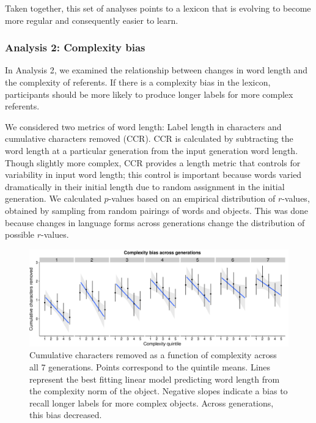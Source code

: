 Taken together, this set of analyses points to a lexicon that is evolving to become more regular and consequently easier to learn.



\subsubsection{Analysis 2: Complexity bias} 

In Analysis  2, we examined the relationship between changes in word length and the complexity of referents. If there is a complexity bias in the lexicon, participants should be more likely to produce longer labels for more complex referents. 

We considered two metrics of word length: Label length in characters and cumulative characters removed (CCR). CCR is calculated by subtracting the word length at a particular generation from the input generation word length. Though slightly more complex, CCR provides a length metric that controls for variability in input word length; this control is important because words varied dramatically in their initial length due to random assignment in the initial generation. We calculated $p$-values based on an empirical distribution of $r$-values, obtained by sampling from random pairings of words and objects. This was done because changes in  language forms across generations change the distribution of possible $r$-values.

\begin{figure}[t!]
\begin{center}
\includegraphics[scale = .4]{figs/complexity_bias.pdf}
\end{center}

\caption{Cumulative characters removed as a function of complexity across all 7 generations. Points correspond to the quintile means. Lines represent the best fitting linear model predicting word length from the complexity norm of the object. Negative slopes indicate a bias to recall longer labels for  more complex objects. Across generations, this bias decreased.}
\label{fig:cbias}
\end{figure}



